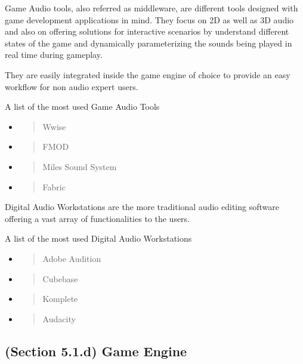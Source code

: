 \documentclass[a4paper,one side,12pt]{book}
\begin{document}
Game Audio tools, also referred as middleware, are different tools
designed with game development applications in mind. They focus on 2D as
well as 3D audio and also on offering solutions for interactive
scenarios by understand different states of the game and dynamically
parameterizing the sounds being played in real time during gameplay.

They are easily integrated inside the game engine of choice to provide
an easy workflow for non audio expert users.

A list of the most used Game Audio Tools

\begin{itemize}
\item
  \begin{quote}
  Wwise
  \end{quote}
\item
  \begin{quote}
  FMOD
  \end{quote}
\item
  \begin{quote}
  Miles Sound System
  \end{quote}
\item
  \begin{quote}
  Fabric
  \end{quote}
\end{itemize}

Digital Audio Workstations are the more traditional audio editing
software offering a vast array of functionalities to the users.

A list of the most used Digital Audio Workstations

\begin{itemize}
\item
  \begin{quote}
  Adobe Audition
  \end{quote}
\item
  \begin{quote}
  Cubebase
  \end{quote}
\item
  \begin{quote}
  Komplete
  \end{quote}
\item
  \begin{quote}
  Audacity
  \end{quote}
\end{itemize}

\subsection{(Section 5.1.d) Game Engine}
\end{document}
